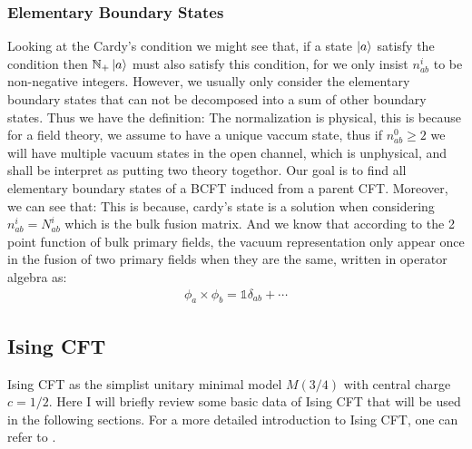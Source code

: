 \subsubsection{Elementary Boundary States}

Looking at the Cardy's condition we might see that, if a state $ \ket{a} $ satisfy the condition then $ \mathbb{N}_+\ket{a} $ must also satisfy this condition, for we only insist $ n^i_{ab} $ to be non-negative integers. 
However, we usually only consider the elementary boundary states that can not be decomposed into a sum of other boundary states. Thus we have the definition:
The normalization is physical, this is because for a field theory, we assume to have a unique vaccum state, thus if $ n_{ab}^0 \geq 2 $ we will have multiple vacuum states in the open channel, which is unphysical, and shall be interpret as putting two theory togethor. Our goal is to find all elementary boundary states of a BCFT induced from a parent CFT.
Moreover, we can see that:
This is because, cardy's state is a solution when considering $ n_{ab}^i = N_{ab}^i $ which is the bulk fusion matrix. And we know that according to the 2 point function of bulk primary fields, the vacuum representation only appear once in the fusion of two primary fields when they are the same, written in operator algebra as:
\begin{align}
  \phi_a \times \phi_b = \mathbb{1} \delta_{ab} + \cdots
\end{align}

\subsection{Ising CFT}

Ising CFT as the simplist unitary minimal model $ M(3/4) $ with central charge $ c=1/2 $. Here I will briefly review some basic data of Ising CFT that will be used in the following sections. For a more detailed introduction to Ising CFT, one can refer to \cite{difrancescoConformalFieldTheory1997}.

